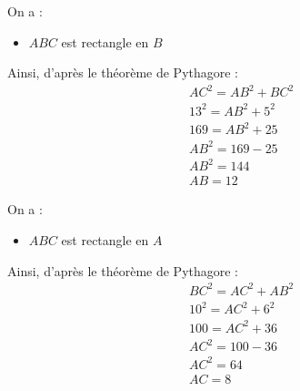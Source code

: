 \begin{multicols}{2}
     \exo{}{} On a :
     \begin{itemize}
         \item $ABC$ est rectangle en $B$
     \end{itemize}
     Ainsi, d'après le théorème de Pythagore :
     \begin{align*}
         &AC^2=AB^2+BC^2\\
         &13^2=AB^2+5^2\\
         &169=AB^2+25\\
         &AB^2=169-25\\
         &AB^2=144\\
         &AB=12
     \end{align*}
 
     \exo{}{} On a :
     \begin{itemize}
        \item $ABC$ est rectangle en $A$
    \end{itemize}
    Ainsi, d'après le théorème de Pythagore :
    \begin{align*}
        &BC^2=AC^2+AB^2\\
        &10^2=AC^2+6^2\\
        &100=AC^2+36\\
        &AC^2=100-36\\
        &AC^2=64\\
        &AC=8
    \end{align*}
   \end{multicols}
